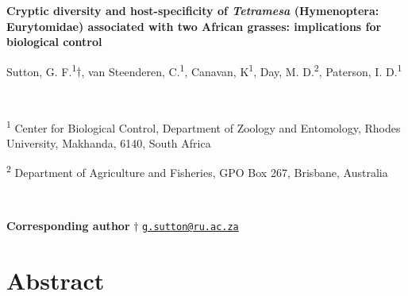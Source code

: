 \documentclass[12pt,]{article}
\author{}
\date{}
\begin{document}
	
%    





\vskip -8.5pt



\noindent \doublespacing 

\pagebreak

\setlength{\parindent}{0in}
\setlength{\leftskip}{0in}
\setlength{\parskip}{8pt}
\vspace*{-0.2in}

\noindent

\textbf{Cryptic diversity and host-specificity of \emph{Tetramesa}
(Hymenoptera: Eurytomidae) associated with two African grasses:
implications for biological control}

Sutton, G. F.\textsuperscript{1}\(\dag\), van Steenderen,
C.\textsuperscript{1}, Canavan, K\textsuperscript{1}, Day, M.
D.\textsuperscript{2}, Paterson, I. D.\textsuperscript{1}

~

\begingroup
\fontsize{10}{12}\selectfont

\textsuperscript{1} Center for Biological Control, Department of Zoology
and Entomology, Rhodes University, Makhanda, 6140, South Africa

\textsuperscript{2} Department of Agriculture and Fisheries, GPO Box
267, Brisbane, Australia \endgroup

~

\textbf{Corresponding author} \(\dag\)
\href{mailto:g.sutton@ru.ac.za}{\nolinkurl{g.sutton@ru.ac.za}}

\pagebreak

\setlength\parindent{24pt}

\hypertarget{abstract}{%
\section{Abstract}\label{abstract}}
\end{document}
